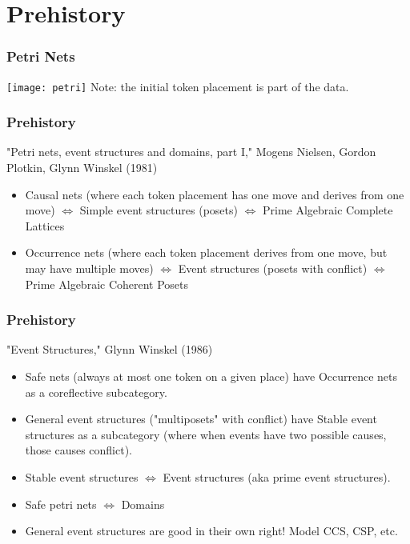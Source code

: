 \documentclass{beamer}
\begin{document}
\section{Prehistory}
\begin{frame}
\frametitle{Petri Nets}
\texttt{[image: petri]}
\centering
\linebreak Note: the initial token placement is part of the data.
\end{frame}
\begin{frame}
\frametitle{Prehistory}

"Petri nets, event structures and domains, part I," Mogens Nielsen, Gordon Plotkin, Glynn Winskel (1981)

\begin{itemize}
\item Causal nets (where each token placement has one move and derives from one move) 
\linebreak \(\Leftrightarrow\) Simple event structures (posets)
\linebreak \(\Leftrightarrow\) Prime Algebraic Complete Lattices
\item Occurrence nets (where each token placement derives from one move, but may have multiple moves)
\linebreak \(\Leftrightarrow\) Event structures (posets with conflict) 
\linebreak \(\Leftrightarrow\) Prime Algebraic Coherent Posets
\end{itemize}

\end{frame}
\begin{frame}
\frametitle{Prehistory}
"Event Structures," Glynn Winskel (1986)
\begin{itemize}
\item Safe nets (always at most one token on a given place) have Occurrence nets as a coreflective subcategory.
\item General event structures ("multiposets" with conflict) have Stable event structures as a subcategory (where when events have two possible causes, those causes conflict).
\item Stable event structures \linebreak \(\Leftrightarrow\)  Event structures (aka prime event structures).
\item Safe petri nets \(\Leftrightarrow\) Domains
\item General event structures are good in their own right! Model CCS, CSP, etc.
\end{itemize}

\end{frame}
\end{document}
